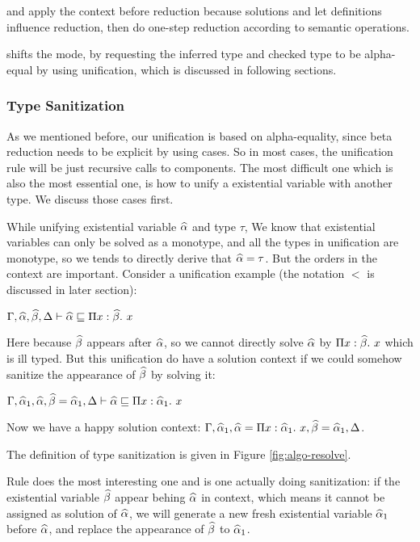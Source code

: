 and  apply the context before reduction because solutions and let definitions influence reduction, then do one-step reduction according to semantic operations.

 shifts the mode, by requesting the inferred type and checked type to be alpha-equal by using unification, which is discussed in following sections.

\subsubsection{Type Sanitization}

As we mentioned before, our unification is based on alpha-equality, since beta reduction needs to be explicit by using cases. So in most cases, the unification rule will be just recursive calls to components. The most difficult one which is also the most essential one, is how to unify a existential variable with another type. We discuss those cases first.

While unifying existential variable $\widehat{\alpha}$ and type $\tau$, We know that existential variables can only be solved as a monotype, and all the types in unification are monotype, so we tends to directly derive that $\widehat{\alpha} = \tau$. But the orders in the context are important. Consider a unification example (the notation $\lt$ is discussed in later section):

$\Gamma, \widehat{\alpha}, \widehat{\beta}, \Delta \vdash \widehat{\alpha} \sqsubseteq \Pi x:\widehat{\beta}.~ x$

Here because $\widehat{\beta}$ appears after $\widehat{\alpha}$, so we cannot directly solve $\widehat{\alpha}$ by $\Pi x:\widehat{\beta}.~ x$ which is ill typed. But this unification do have a solution context if we could somehow sanitize the appearance of $\widehat{\beta}$ by solving it:

$\Gamma, \widehat{\alpha}_1, \widehat{\alpha}, \widehat{\beta} = \widehat{\alpha}_1, \Delta \vdash \widehat{\alpha} \sqsubseteq \Pi x:\widehat{\alpha}_1.~ x$

Now we have a happy solution context: $\Gamma, \widehat{\alpha}_1, \widehat{\alpha} = \Pi x:\widehat{\alpha}_1.~ x, \widehat{\beta} = \widehat{\alpha}_1, \Delta$.

The definition of type sanitization is given in Figure \ref{fig:algo-resolve}.

Rule  does the most interesting one and is one actually doing sanitization: if the existential variable $\widehat{\beta}$ appear behing $\widehat{\alpha}$ in context, which means it cannot be assigned as solution of $\widehat{\alpha}$, we will generate a new fresh existential variable $\widehat{\alpha}_1$ before $\widehat{\alpha}$, and replace the appearance of $\widehat{\beta}$ to $\widehat{\alpha}_1$.

